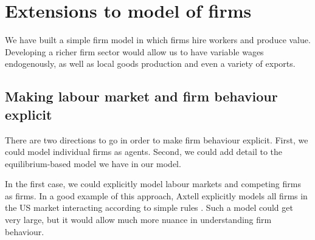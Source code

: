 



\section{Extensions to model of firms}
We have built a simple firm model in which firms hire workers and produce value. Developing a richer firm sector would allow us to have variable wages endogenously, as well as local goods production and even a variety of exports. %


\subsection{Making labour market and firm behaviour explicit} 
There are two directions to go in order to make firm behaviour explicit. First, we could model individual firms as agents. Second, we could add detail to the equilibrium-based model we have in our model.  

In the first case, we could explicitly model labour markets and competing firms as firms. In a good example of this approach, Axtell explicitly models all firms in the US market interacting according to simple rules \cite{axtellDynamicsFirmsData2024}. Such a model could get very large, but it would allow much more nuance in understanding firm behaviour. 

